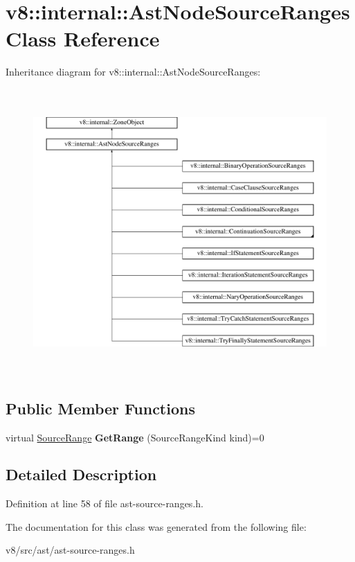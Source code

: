 \hypertarget{classv8_1_1internal_1_1AstNodeSourceRanges}{}\section{v8\+:\+:internal\+:\+:Ast\+Node\+Source\+Ranges Class Reference}
\label{classv8_1_1internal_1_1AstNodeSourceRanges}
Inheritance diagram for v8\+:\+:internal\+:\+:Ast\+Node\+Source\+Ranges\+:\begin{figure}[H]
\begin{center}
\leavevmode
\includegraphics[height=10.921986cm]{classv8_1_1internal_1_1AstNodeSourceRanges}
\end{center}
\end{figure}
\subsection*{Public Member Functions}
\begin{DoxyCompactItemize}
\item 
\mbox{\label{classv8_1_1internal_1_1AstNodeSourceRanges_a9eca867905c7141604337dca9414518f}} 
virtual \mbox{\hyperlink{structv8_1_1internal_1_1SourceRange}{Source\+Range}} {\bfseries Get\+Range} (Source\+Range\+Kind kind)=0
\end{DoxyCompactItemize}


\subsection{Detailed Description}


Definition at line 58 of file ast-\/source-\/ranges.\+h.



The documentation for this class was generated from the following file\+:\begin{DoxyCompactItemize}
\item 
v8/src/ast/ast-\/source-\/ranges.\+h\end{DoxyCompactItemize}
